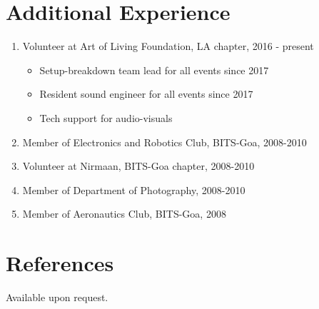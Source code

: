 \documentclass{article}
\begin{document}
\section{Additional Experience}
\begin{enumerate}
    \item Volunteer at Art of Living Foundation, LA chapter, 2016 - present
    \begin{itemize}
        \item Setup-breakdown team lead for all events since 2017
        \item Resident sound engineer for all events since 2017
        \item Tech support for audio-visuals
    \end{itemize}
    \item Member of Electronics and Robotics Club, BITS-Goa, 2008-2010
    \item Volunteer at Nirmaan, BITS-Goa chapter, 2008-2010
    \item Member of Department of Photography, 2008-2010
    \item Member of Aeronautics Club, BITS-Goa, 2008
\end{enumerate}


\section{References}
Available upon request.
\end{document}
